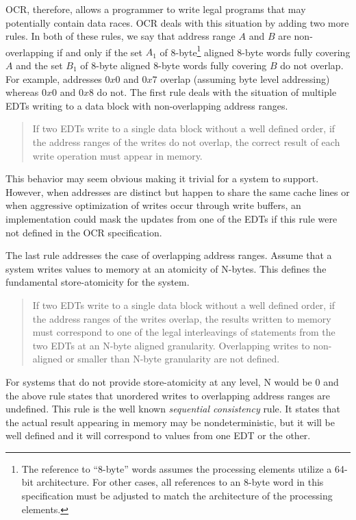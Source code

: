 OCR, therefore, allows a programmer to write legal programs that may
potentially contain data races. OCR deals with this situation by
adding two more rules. In both of these rules, we say that address
range $A$ and $B$ are non-overlapping if and only if the set $A_1$ of
8-byte\footnote{The reference to ``8-byte'' words assumes the processing elements
utilize a 64-bit architecture.  For other cases, all references to an 8-byte
word in this specification must be adjusted to match the architecture of the processing elements.}
aligned 8-byte words fully covering $A$ and the set $B_1$ of
8-byte aligned 8-byte words fully covering $B$ do not overlap. For
example, addresses
$0x0$ and $0x7$ overlap (assuming byte level addressing) whereas
$0x0$ and $0x8$ do not.
The first rule deals with the situation of multiple
EDTs writing to a data block with non-overlapping address ranges.
\begin{quote}
If two EDTs write to a single data block without a well defined order,
if the address ranges of the writes do not overlap, the correct result
of each write operation must appear in memory.
\end{quote}

This behavior may seem obvious making it trivial for a system to
support. However, when addresses are distinct but happen to share the
same cache lines or when aggressive optimization of writes occur
through write buffers, an implementation could mask the updates from
one of the EDTs if this rule were not defined in the OCR
specification.

The last rule addresses the case of overlapping address ranges.  Assume that
a system writes values to memory at an atomicity of N-bytes.  This defines
the fundamental store-atomicity for the system.
\begin{quote}
If two EDTs write to a single data block without a well defined order,
if the address ranges of the writes overlap, the results written to
memory must correspond to one of the legal interleavings of statements
from the two EDTs at an N-byte aligned granularity. Overlapping writes
to non-aligned or smaller than N-byte granularity are not defined.
\end{quote}
For systems that do not provide store-atomicity at any level, N would be 0
and the above rule states that unordered writes to overlapping address
ranges are undefined.
This rule is the well known \emph{sequential consistency} rule. It states that the actual result appearing in
memory may be nondeterministic, but it will be well defined and it
will correspond to values from one EDT or the other.

